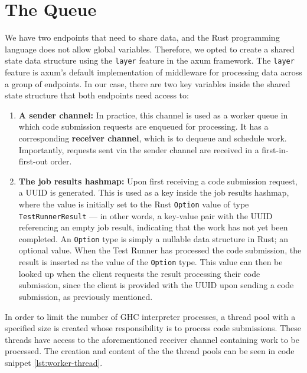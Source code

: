 \section{The Queue} \label{sec:queue-system}
We have two endpoints that need to share data, and the Rust programming language does not allow global variables.
Therefore, we opted to create a shared state data structure using the \texttt{layer} feature in the axum framework.
The \texttt{layer} feature is axum's default implementation of middleware for processing data across a group of endpoints.
In our case, there are two key variables inside the shared state structure that both endpoints need access to:
\begin{enumerate}
    \item \textbf{A sender channel:} In practice, this channel is used as a worker queue in which code submission requests are enqueued for processing. It has a corresponding \textbf{receiver channel}, which is to dequeue and schedule work. Importantly, requests sent via the sender channel are received in a first-in-first-out order.
    \item \textbf{The job results hashmap:} Upon first receiving a code submission request, a UUID is generated. This is used as a key inside the job results hashmap, where the value is initially set to the Rust \texttt{Option} value of type \texttt{TestRunnerResult} --- in other words, a key-value pair with the UUID referencing an empty job result, indicating that the work has not yet been completed. An \texttt{Option} type is simply a nullable data structure in Rust; an optional value. When the Test Runner has processed the code submission, the result is inserted as the value of the \texttt{Option} type. This value can then be looked up when the client requests the result processing their code submission, since the client is provided with the UUID upon sending a code submission, as previously mentioned.
\end{enumerate}

In order to limit the number of GHC interpreter processes, a thread pool with a specified size is created whose responsibility is to process code submissions.
These threads have access to the aforementioned receiver channel containing work to be processed.
The creation and content of the the thread pools can be seen in code snippet \ref{lst:worker-thread}.

